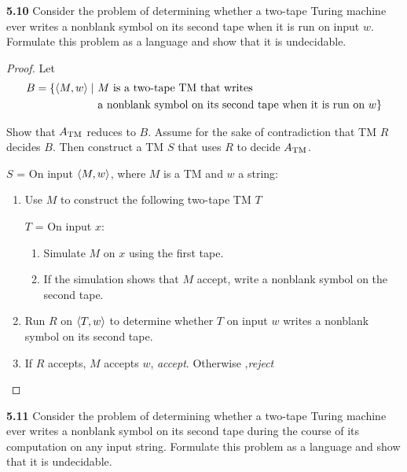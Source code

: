 \textbf{5.10} Consider the problem of determining whether a two-tape Turing machine ever writes a nonblank symbol on its second tape when it is run on input $w$. Formulate
this problem as a language and show that it is undecidable.
\begin{mdframed}
\begin{proof}
Let
\begin{align*}
B = \{ \langle{M, w}\rangle \mid \  & \text{$M$ is a two-tape TM that writes} \\
& \text{a nonblank symbol on its second tape when it is run on $w$} \}
\end{align*}

Show that $A_{\text{TM}}$ reduces to $B$. Assume for the sake of contradiction that TM $R$ decides $B$. Then construct a TM $S$ that uses $R$ to decide $A_{\text{TM}}$.

\medskip
$S$ = On input $\langle{M, w}\rangle$, where $M$ is a TM and $w$ a string:
\begin{enumerate}
\item Use $M$ to construct the following two-tape TM $T$

$T$ = On input $x$:
\begin{enumerate}
\item Simulate $M$ on $x$ using the first tape.
\item If the simulation shows that $M$ accept, write a nonblank symbol on the second tape.
\end{enumerate}
\item Run $R$ on $\langle{T, w}\rangle$ to determine whether $T$ on input $w$ writes a nonblank symbol on its second tape.
\item If $R$ accepts, $M$ accepts $w$, \textit{accept}. Otherwise ,\textit{reject}
\end{enumerate}
\end{proof}
\end{mdframed}

\textbf{5.11} Consider the problem of determining whether a two-tape Turing machine ever writes a nonblank symbol on its second tape during the course of its computation on any input string. Formulate this problem as a language and show that it is undecidable.

